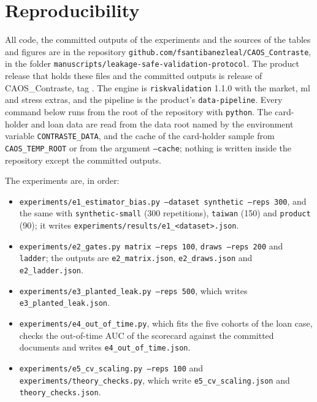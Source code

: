 \section{Reproducibility}
\label{sec:reproducibility}

All code, the committed outputs of the experiments and the sources of the tables and figures are in the repository \texttt{github.com/\allowbreak{}fsantibanezleal/\allowbreak{}CAOS\_\allowbreak{}Contraste}, in the folder \texttt{manuscripts/\allowbreak{}leakage-safe-validation-protocol}. The product release that holds these files and the committed outputs is release \docversion{} of CAOS\_\allowbreak{}Contraste, tag \docversion{}. The engine is \texttt{riskvalidation} 1.1.0 with the market, ml and stress extras, and the pipeline is the product's \texttt{data-pipeline}. Every command below runs from the root of the repository with \texttt{python}. The card-holder and loan data are read from the data root named by the environment variable \texttt{CONTRASTE\_\allowbreak{}DATA}, and the cache of the card-holder sample from \texttt{CAOS\_\allowbreak{}TEMP\_\allowbreak{}ROOT} or from the argument \texttt{--cache}; nothing is written inside the repository except the committed outputs. %

The experiments are, in order:

\begin{itemize}
\item \texttt{experiments/\allowbreak{}e1\_\allowbreak{}estimator\_\allowbreak{}bias.py --dataset synthetic --reps 300}, and the same with \texttt{synthetic-small} (300 repetitions), \texttt{taiwan} (150) and \texttt{product} (90); it writes \texttt{experiments/\allowbreak{}results/\allowbreak{}e1\_\allowbreak{}<dataset>.json}.
\item \texttt{experiments/\allowbreak{}e2\_\allowbreak{}gates.py matrix --reps 100}, \texttt{draws --reps 200} and \texttt{ladder}; the outputs are \texttt{e2\_\allowbreak{}matrix.json}, \texttt{e2\_\allowbreak{}draws.json} and \texttt{e2\_\allowbreak{}ladder.json}.
\item \texttt{experiments/\allowbreak{}e3\_\allowbreak{}planted\_\allowbreak{}leak.py --reps 500}, which writes \texttt{e3\_\allowbreak{}planted\_\allowbreak{}leak.json}.
\item \texttt{experiments/\allowbreak{}e4\_\allowbreak{}out\_\allowbreak{}of\_\allowbreak{}time.py}, which fits the five cohorts of the loan case, checks the out-of-time AUC of the scorecard against the committed documents and writes \texttt{e4\_\allowbreak{}out\_\allowbreak{}of\_\allowbreak{}time.json}.
\item \texttt{experiments/\allowbreak{}e5\_\allowbreak{}cv\_\allowbreak{}scaling.py --reps 100} and \texttt{experiments/\allowbreak{}theory\_\allowbreak{}checks.py}, which write \texttt{e5\_\allowbreak{}cv\_\allowbreak{}scaling.json} and \texttt{theory\_\allowbreak{}checks.json}.
\end{itemize}

